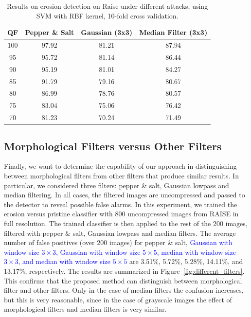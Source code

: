 \documentclass{ieeeaccess}
\newcommand{\revisedtext}[1]{\textcolor{blue}{#1}}
\begin{document}
\begin{table}[t!]
	\centering
	\caption{Results on erosion detection on Raise under different attacks, using SVM with RBF kernel, 10-fold cross validation.}
	\label{table:attacks2}
	\begin{tabular}{c|ccc}
		\hline\hline
		\textbf{QF} & \textbf{Pepper \& Salt}&\textbf{Gaussian (3x3)}&\textbf{Median Filter (3x3)}\\
		\hline
		100&97.92&81.21&87.94\\
		95&95.72&81.14&86.44\\
		90&95.19&81.01&84.27\\
		85&91.79&79.16&80.67\\
		80&86.99&78.76&80.57\\
		75&83.04&75.06&76.42\\
		70&81.23&70.24&71.49\\
		\hline\hline	
	\end{tabular}
\end{table}

\subsection{Morphological Filters versus Other Filters }
\label{subsec:results_different_filters}

Finally, we want to determine the capability of our approach in distinguishing between morphological filters from other filters that produce similar results. In particular, we considered three filters: pepper \& salt, Gaussian lowpass and median filtering. In all cases, the filtered images are uncompressed and passed to the detector to reveal possible false alarms. 
In this experiment, we trained the erosion versus pristine classifier with 800 uncompressed images from RAISE in full resolution. The trained classifier is then applied to the rest of the 200 images, filtered with pepper \& salt, Gaussian lowpass and median filters. The average number of false positives (over 200 images) for pepper \& salt, \revisedtext{ Gaussian with window size $3 \times 3$, Gaussian with window size $5 \times 5$, median with window size $3 \times 3$, and median with window size $5 \times 5$} are 3.51\%, 5.72\%, 5.28\%, 14.11\%, and 13.17\%, respectively. The results are summarized in Figure~\ref{fig:different_filters}.  
This confirms that the proposed method can distinguish between morphological filter and other filters. Only in the case of median filters the confusion increases, but this is very reasonable, since in the case of grayscale images the effect of morphological filters and median filters is very similar.
\end{document}
